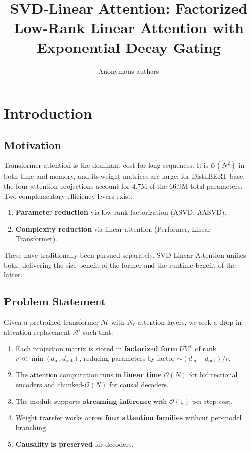 \title{\textbf{SVD-Linear Attention: Factorized Low-Rank Linear Attention with Exponential Decay Gating}}

\author{Anonymous authors}



\section{Introduction}

\subsection{Motivation}

Transformer attention is the dominant cost for long sequences. It is 
$\mathcal{O}(N^2)$ in both time and memory, and its weight matrices are large: 
for DistilBERT-base, the four attention projections account for 4.7M of the 
66.9M total parameters. Two complementary efficiency levers exist:

\begin{enumerate}
\item \textbf{Parameter reduction} via low-rank factorization (ASVD, AASVD).
\item \textbf{Complexity reduction} via linear attention (Performer, Linear Transformer).

\end{enumerate}
These have traditionally been pursued separately. SVD-Linear Attention unifies 
both, delivering the size benefit of the former and the runtime benefit of the 
latter.

\subsection{Problem Statement}

Given a pretrained transformer $\mathcal{M}$ with $N_\ell$ attention layers, 
we seek a drop-in attention replacement $\mathcal{A}'$ such that:

\begin{enumerate}
\item Each projection matrix is stored in \textbf{factorized form} $UV^\top$ of rank
  $r \ll \min(d_\text{in}, d_\text{out})$, reducing parameters by factor
  $\sim (d_\text{in} + d_\text{out})/r$.
\item The attention computation runs in \textbf{linear time} $\mathcal{O}(N)$ for
  bidirectional encoders and chunked-$\mathcal{O}(N)$ for causal decoders.
\item The module supports \textbf{streaming inference} with $\mathcal{O}(1)$ per-step
  cost.
\item Weight transfer works across \textbf{four attention families} without
  per-model branching.
\item \textbf{Causality is preserved} for decoders.

\end{enumerate}
